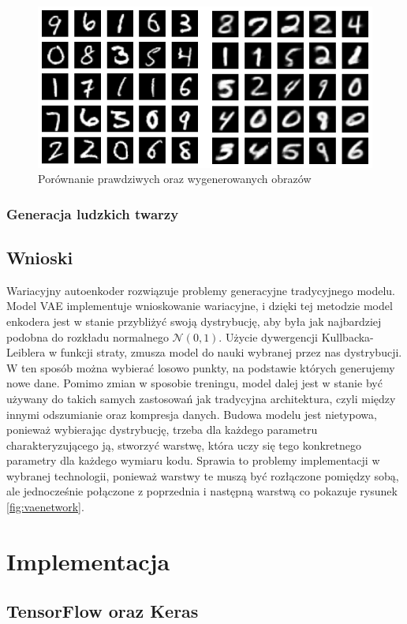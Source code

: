 \documentclass[a4paper,12pt,oneside]{book} %
\begin{document}
\begin{figure}[h!]
	\centering
	\includegraphics[width=12cm]{vaegeneracja.png}
	\caption{Porównanie prawdziwych oraz wygenerowanych obrazów}
	\label{fig:vaegeneracja}
\end{figure}

\subsection{Generacja ludzkich twarzy}
\lipsum[1]
\section{Wnioski}
Wariacyjny autoenkoder rozwiązuje problemy generacyjne tradycyjnego modelu. Model VAE implementuje wnioskowanie wariacyjne, i dzięki tej metodzie model enkodera jest w stanie przybliżyć swoją dystrybucję, aby była jak najbardziej podobna do rozkładu normalnego $\mathcal{N}(0, 1)$. Użycie dywergencji Kullbacka-Leiblera w funkcji straty, zmusza model do nauki wybranej przez nas dystrybucji. W ten sposób można wybierać losowo punkty, na podstawie których generujemy nowe dane. Pomimo zmian w sposobie treningu, model dalej jest w stanie być używany do takich samych zastosowań jak tradycyjna architektura, czyli między innymi odszumianie oraz kompresja danych. Budowa modelu jest nietypowa, ponieważ wybierając dystrybucję, trzeba dla każdego parametru charakteryzującego ją, stworzyć warstwę, która uczy się tego konkretnego parametry dla każdego wymiaru kodu. Sprawia to problemy implementacji w wybranej technologii, ponieważ warstwy te muszą być rozłączone pomiędzy sobą, ale jednocześnie połączone z poprzednia i następną warstwą co pokazuje rysunek \ref{fig:vaenetwork}. 


\chapter{Implementacja}
\section{TensorFlow oraz Keras}
\end{document}
